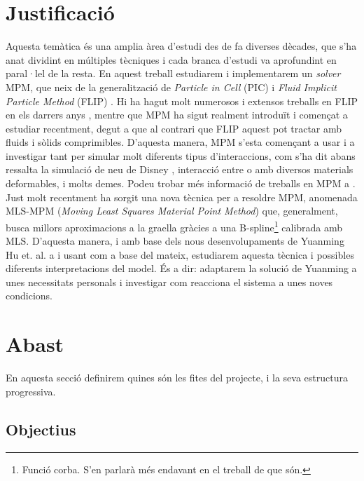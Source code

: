 \documentclass[a4paper]{report}
\begin{document}
	\section{Justificació}
	Aquesta temàtica és una amplia àrea d'estudi des de fa diverses dècades, que s'ha anat dividint en múltiples tècniques i cada branca d'estudi va aprofundint en paral·lel de la resta.
	\newline
	En aquest treball estudiarem i implementarem un \textit{solver} MPM, que neix de la generalització de \textit{Particle in Cell} (PIC) i \textit{Fluid Implicit Particle Method} (FLIP) \cite{Sulsky1995}. Hi ha hagut molt numerosos i extensos treballs en FLIP en els darrers anys \cite{Bridson2018,Zhu2005}, mentre que MPM ha sigut realment introduït i començat a estudiar recentment, degut a que al contrari que FLIP aquest pot tractar amb fluids i sòlids comprimibles.
	\newline
	D'aquesta manera, MPM s'esta començant a usar i a investigar tant per simular molt diferents tipus d'interaccions, com s'ha dit abans ressalta la simulació de neu de Disney \cite{Stomakhin}, interacció entre o amb diversos materials deformables\cite{Hegemann2013}, i molts demes. Podeu trobar més informació de treballs en MPM a \cite{Jiang2016}.
	\newline
	Just molt recentment ha sorgit una nova tècnica per a resoldre MPM, anomenada MLS-MPM (\textit{Moving Least Squares Material Point Method})\cite{hu2018mlsmpmcpic} que, generalment, busca millors aproximacions a la graella gràcies a una B-spline\footnote{Funció corba. S'en parlarà més endavant en el treball de que són.} calibrada amb MLS. 
	\newline
	D'aquesta manera, i amb base dels nous desenvolupaments de Yuanming Hu et. al. a \cite{hu2018mlsmpmcpic} i usant com a base \cite{Hu} del mateix, estudiarem aquesta tècnica i possibles diferents interpretacions del model. És a dir: adaptarem la solució de Yuanming a unes necessitats personals i investigar com reacciona el sistema a unes noves condicions.
	
	\section{Abast}
	En aquesta secció definirem quines són les fites del projecte, i la seva estructura progressiva.
	\subsection{Objectius}
\end{document}
